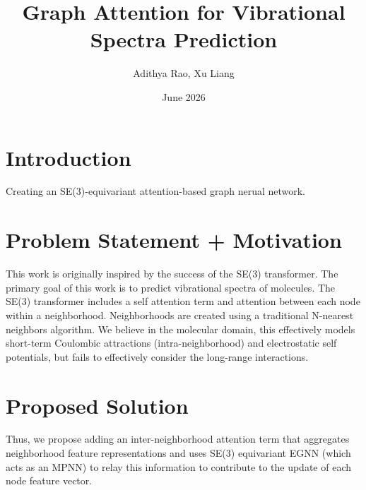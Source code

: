 \documentclass{article}
\title{Graph Attention for Vibrational Spectra Prediction}
\author{Adithya Rao, Xu Liang}
\date{June 2026}
\begin{document}
\maketitle{}

\section{Introduction}
Creating an SE(3)-equivariant attention-based graph nerual network.

\section{Problem Statement + Motivation}
This work is originally inspired by the success of the SE(3) transformer. The primary goal of this work is to predict vibrational spectra of molecules. The SE(3) transformer includes a self attention term and attention between each node within a neighborhood. Neighborhoods are created using a traditional N-nearest neighbors algorithm. We believe in the molecular domain, this effectively models short-term Coulombic attractions (intra-neighborhood) and electrostatic self potentials, but fails to effectively consider the long-range interactions. 

\section{Proposed Solution}
Thus, we propose adding an inter-neighborhood attention term that aggregates neighborhood feature representations and uses SE(3) equivariant EGNN (which acts as an MPNN) to relay this information to contribute to the update of each node feature vector. 
\end{document}
